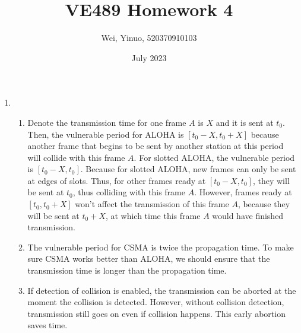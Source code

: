 \documentclass{article}
\title{VE489 Homework 4}
\author{Wei, Yinuo, 520370910103}
\date{July 2023}
\begin{document}
\maketitle

\begin{enumerate}
    \item 
    \begin{enumerate}
        \item 
        Denote the transmission time for one frame $A$ is $X$ and it is sent at $t_0$. Then, the vulnerable period for ALOHA is $[t_0-X, t_0+X]$ because another frame that begins to be sent by another station at this period will collide with this frame $A$.
        \newline For slotted ALOHA, the vulnerable period is $[t_0-X, t_0]$. Because for slotted ALOHA, new frames can only be sent at edges of slots. Thus, for other frames ready at $[t_0-X, t_0]$, they will be sent at $t_0$, thus colliding with this frame $A$. However, frames ready at $[t_0, t_0+X]$ won't affect the transmission of this frame $A$, because they will be sent at $t_0+X$, at which time this frame $A$ would have finished transmission.
        
        \item
        The vulnerable period for CSMA is twice the propagation time. To make sure CSMA works better than ALOHA, we should ensure that the transmission time is longer than the propagation time.
        
        \item 
        If detection of collision is enabled, the transmission can be aborted at the moment the collision is detected. However, without collision detection, transmission still goes on even if collision happens. This early abortion saves time.
        
    \end{enumerate}
    

\end{enumerate}
\end{document}

